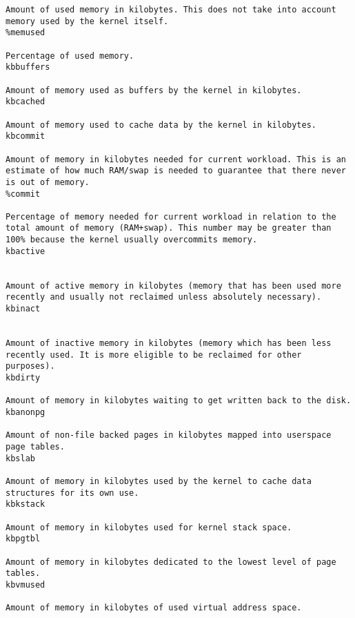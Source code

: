 \begin{verbatim}
Amount of used memory in kilobytes. This does not take into account memory used by the kernel itself.
%memused 

Percentage of used memory.
kbbuffers 

Amount of memory used as buffers by the kernel in kilobytes.
kbcached 

Amount of memory used to cache data by the kernel in kilobytes.
kbcommit 

Amount of memory in kilobytes needed for current workload. This is an estimate of how much RAM/swap is needed to guarantee that there never is out of memory.
%commit 

Percentage of memory needed for current workload in relation to the total amount of memory (RAM+swap). This number may be greater than 100% because the kernel usually overcommits memory.
kbactive


Amount of active memory in kilobytes (memory that has been used more recently and usually not reclaimed unless absolutely necessary).
kbinact


Amount of inactive memory in kilobytes (memory which has been less recently used. It is more eligible to be reclaimed for other  purposes).
kbdirty

Amount of memory in kilobytes waiting to get written back to the disk.
kbanonpg

Amount of non-file backed pages in kilobytes mapped into userspace page tables.
kbslab

Amount of memory in kilobytes used by the kernel to cache data structures for its own use.
kbkstack

Amount of memory in kilobytes used for kernel stack space.
kbpgtbl

Amount of memory in kilobytes dedicated to the lowest level of page tables.
kbvmused

Amount of memory in kilobytes of used virtual address space.




\end{verbatim}